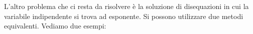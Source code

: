 L'altro problema che ci resta da risolvere è la soluzione di disequazioni 
in cui la variabile indipendente si trova ad esponente. 
% 
Si possono utilizzare due metodi equivalenti. Vediamo due esempi:

